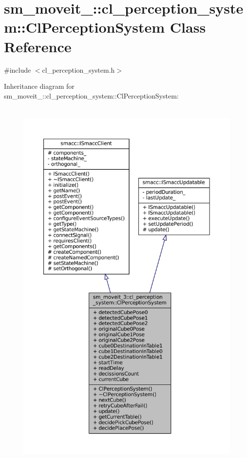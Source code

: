 \hypertarget{classsm__moveit__3_1_1cl__perception__system_1_1ClPerceptionSystem}{}\section{sm\+\_\+moveit\+\_\+:\+:cl\+\_\+perception\+\_\+system\+:\+:Cl\+Perception\+System Class Reference}
\label{classsm__moveit__3_1_1cl__perception__system_1_1ClPerceptionSystem}


{\ttfamily \#include $<$cl\+\_\+perception\+\_\+system.\+h$>$}



Inheritance diagram for sm\+\_\+moveit\+\_\+:\+:cl\+\_\+perception\+\_\+system\+:\+:Cl\+Perception\+System\+:
\nopagebreak
\begin{figure}[H]
\begin{center}
\leavevmode
\includegraphics[height=550pt]{classsm__moveit__3_1_1cl__perception__system_1_1ClPerceptionSystem__inherit__graph}
\end{center}
\end{figure}


